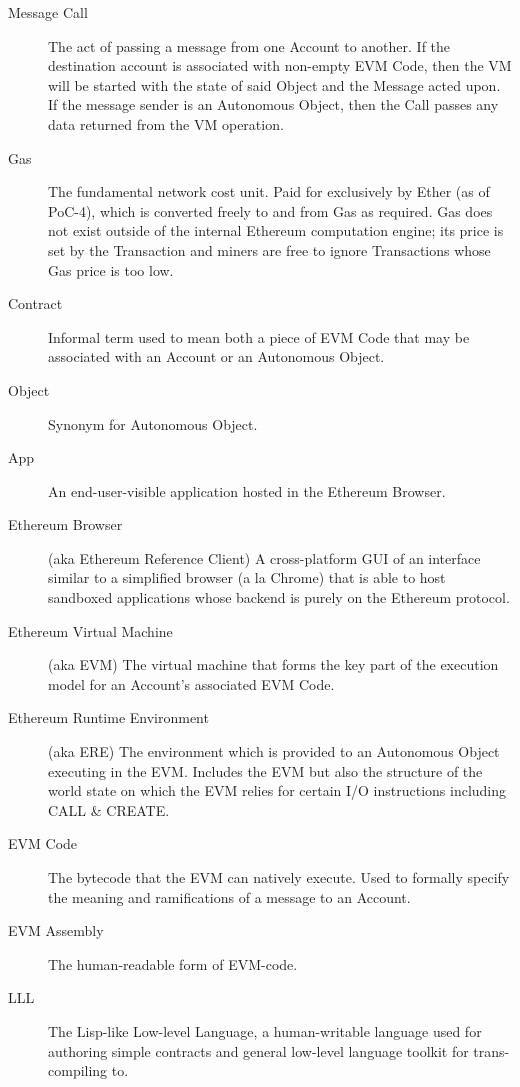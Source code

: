 \documentclass[9pt,oneside]{amsart}
\begin{document}
\begin{description}
\item[Message Call] The act of passing a message from one Account to another. If the destination account is associated with non-empty EVM Code, then the VM will be started with the state of said Object and the Message acted upon. If the message sender is an Autonomous Object, then the Call passes any data returned from the VM operation.

\item[Gas] The fundamental network cost unit. Paid for exclusively by Ether (as of PoC-4), which is converted freely to and from Gas as required. Gas does not exist outside of the internal Ethereum computation engine; its price is set by the Transaction and miners are free to ignore Transactions whose Gas price is too low.

\item[Contract] Informal term used to mean both a piece of EVM Code that may be associated with an Account or an Autonomous Object.

\item[Object] Synonym for Autonomous Object.

\item[App] An end-user-visible application hosted in the Ethereum Browser.

\item[Ethereum Browser] (aka Ethereum Reference Client) A cross-platform GUI of an interface similar to a simplified browser (a la Chrome) that is able to host sandboxed applications whose backend is purely on the Ethereum protocol.

\item[Ethereum Virtual Machine] (aka EVM) The virtual machine that forms the key part of the execution model for an Account's associated EVM Code.

\item[Ethereum Runtime Environment] (aka ERE) The environment which is provided to an Autonomous Object executing in the EVM. Includes the EVM but also the structure of the world state on which the EVM relies for certain I/O instructions including CALL \& CREATE.

\item[EVM Code] The bytecode that the EVM can natively execute. Used to formally specify the meaning and ramifications of a message to an Account.

\item[EVM Assembly] The human-readable form of EVM-code.

\item[LLL] The Lisp-like Low-level Language, a human-writable language used for authoring simple contracts and general low-level language toolkit for trans-compiling to.

\end{description}
\end{document}
